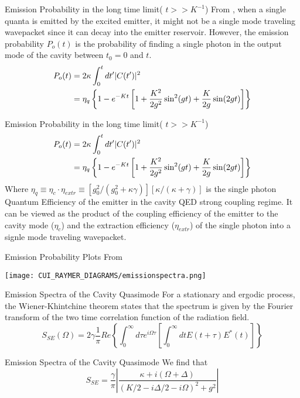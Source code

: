 \begin{frame}{Emission Probability in the long time limit( $t >> K^{-1}$)}
    From \citep{Cui2005}, when a single quanta is emitted by the excited emitter, it might not be a single mode traveling wavepacket since it can decay into the emitter reservoir. However, the emission probability $P_o (t)$ is the probability of finding a single photon in the output mode of the cavity between $t_0 = 0$ and $t$.
    \begin{align}
    \notag
    P_o(t) &= 2 \kappa \int_0^t dt' |C(t')|^2 \\ \label{eq_probability_output}
    &= \eta_q\left \{ 1-e^{-K t} \left [ 1+\frac{K^2}{2 g^2} \sin^2(g t) + \frac{K}{2 g} \sin (2 g t) \right ] \right \}
    \end{align}
\end{frame}
\begin{frame}{Emission Probability in the long time limit( $t >> K^{-1}$)}
   \begin{align}
    \notag
    P_o(t) &= 2 \kappa \int_0^t dt' |C(t')|^2 \\ \label{eq_probability_output}
    &= \eta_q\left \{ 1-e^{-K t} \left [ 1+\frac{K^2}{2 g^2} \sin^2(g t) + \frac{K}{2 g} \sin (2 g t) \right ] \right \}
    \end{align}
    Where $\eta_q \equiv \eta_c \cdot \eta_{extr} \equiv [g_0^2/(g_0^2 + \kappa \gamma)] [\kappa/(\kappa +\gamma)]$ is the single photon Quantum Efficiency of the emitter in the cavity QED strong coupling regime. It can be viewed as the product of the coupling efficiency of the emitter to the cavity mode ($\eta_{c}$) and the extraction efficiency ($\eta_{extr}$) of the single photon into a signle mode traveling wavepacket. 
\end{frame}

\begin{frame}{Emission Probability Plots}
    From \citep{Cui2005}
    \begin{center}
        \texttt{[image: CUI\_RAYMER\_DIAGRAMS/emissionspectra.png]}
    \end{center}
\end{frame}


\begin{frame}{Emission Spectra of the Cavity Quasimode}
    For a stationary and ergodic process, the Wiener-Khintchine theorem states that the spectrum is given by the Fourier transform of the two time correlation function of the radiation field. 
    \begin{equation}
        S_{SE}(\Omega) = 2 \gamma \frac{1}{\pi} Re\left \{ \int_0^\infty d\tau e^{i \Omega \tau} \left [ \int_0^\infty dt E(t+\tau)E^*(t)\right ] \right \}
    \end{equation}
\end{frame}


\begin{frame}{Emission Spectra of the Cavity Quasimode}
    We find that 
    \begin{equation}
        S_{SE} = \frac{\gamma}{\pi}\left|\frac{\kappa + i(\Omega + \Delta)}{(K/2 - i \Delta /2 -i \Omega)^2 + g^2} \right |
    \end{equation}
\end{frame}


